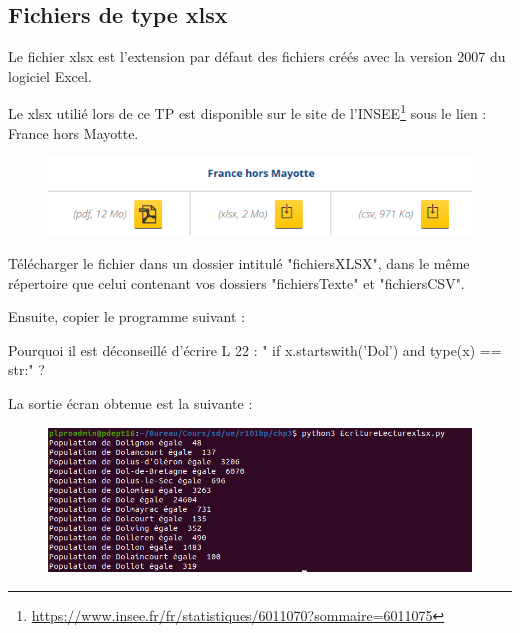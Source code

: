 \subsection{Fichiers de type xlsx}

Le fichier xlsx est l'extension par défaut des fichiers créés avec la version 2007 du logiciel Excel.

Le xlsx utilié lors de ce TP est disponible sur le site de l'INSEE\footnote{\url{https://www.insee.fr/fr/statistiques/6011070?sommaire=6011075}}
sous le lien : France hors Mayotte. 


\begin{figure}[H]
    \centering
    \includegraphics[scale = 0.5]{chapitre3/figures/xlsxTl.png}
\end{figure}

Télécharger le fichier dans un dossier intitulé "fichiersXLSX", dans le même répertoire que celui contenant vos dossiers "fichiersTexte" et "fichiersCSV".

Ensuite, copier le programme suivant :




\begin{tcolorbox}[lefttitle=2cm, colframe=gray!75!black, title= \textbf{Exercice}]
Pourquoi il est déconseillé d'écrire L 22 : " if x.startswith('Dol') and type(x) == str:"  ?
\vspace{2cm}
\end{tcolorbox}



La sortie écran obtenue est la suivante : 

\begin{figure}[H]
    \centering
    \includegraphics[scale = 0.5]{chapitre3/figures/xlsxCE.png}
\end{figure}

